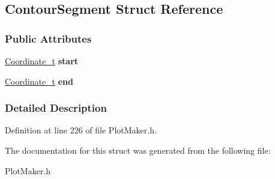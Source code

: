 \hypertarget{structContourSegment}{
\subsection{ContourSegment Struct Reference}
\label{structContourSegment}
}
\subsubsection*{Public Attributes}
\begin{DoxyCompactItemize}
\item 
\hypertarget{structContourSegment_afc26cccc3f893d1b435f5d293e8b5b5d}{
\hyperlink{structCoordinate__t}{Coordinate\_\-t} {\bfseries start}}
\label{structContourSegment_afc26cccc3f893d1b435f5d293e8b5b5d}

\item 
\hypertarget{structContourSegment_a33c547a5a7bcc2a2f8584cb377267af3}{
\hyperlink{structCoordinate__t}{Coordinate\_\-t} {\bfseries end}}
\label{structContourSegment_a33c547a5a7bcc2a2f8584cb377267af3}

\end{DoxyCompactItemize}


\subsubsection{Detailed Description}


Definition at line 226 of file PlotMaker.h.



The documentation for this struct was generated from the following file:\begin{DoxyCompactItemize}
\item 
PlotMaker.h\end{DoxyCompactItemize}
